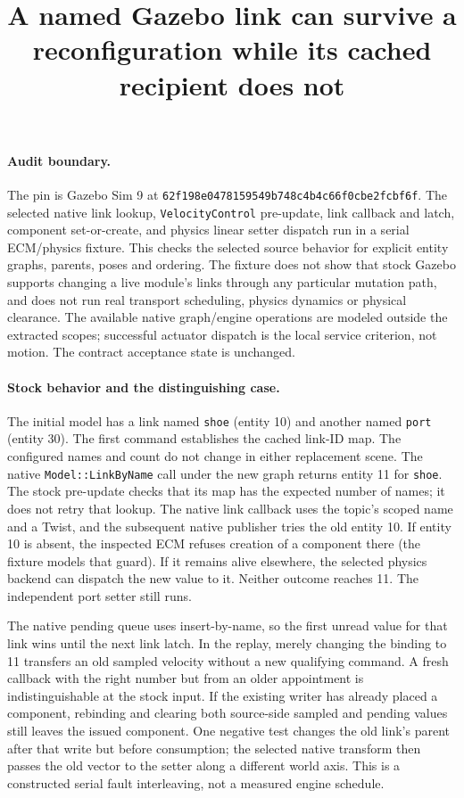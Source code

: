\documentclass{article}
\begin{document}
\title{A named Gazebo link can survive a reconfiguration while its cached recipient does not}
\maketitle

\paragraph{Audit boundary.}
The pin is Gazebo Sim 9 at
\texttt{62f198e0478159549b748c4b4c66f0cbe2fcbf6f}.
The selected native link lookup, \texttt{VelocityControl} pre-update,
link callback and latch, component set-or-create, and physics linear setter
dispatch run in a serial ECM/physics fixture. This checks the selected
source behavior for explicit entity graphs, parents, poses and ordering.
The fixture does not show that stock Gazebo supports changing a live
module's links through any particular mutation path, and does not run
real transport scheduling, physics dynamics or physical clearance.
The available native graph/engine operations are modeled outside the
extracted scopes; successful actuator dispatch is the local service
criterion, not motion. The contract acceptance state is unchanged.

\paragraph{Stock behavior and the distinguishing case.}
The initial model has a link named \texttt{shoe} (entity 10) and another
named \texttt{port} (entity 30). The first command establishes the cached
link-ID map. The configured names and count do not change in either
replacement scene. The native \texttt{Model::LinkByName} call under
the new graph returns entity 11 for \texttt{shoe}. The stock pre-update
checks that its map has the expected number of names; it does not retry
that lookup. The native link callback uses the topic's scoped name and a
Twist, and the subsequent native publisher tries the old entity 10.
If entity 10 is absent, the inspected ECM refuses creation of a component
there (the fixture models that guard). If it remains alive elsewhere, the
selected physics backend can dispatch the new value to it. Neither
outcome reaches 11. The independent port setter still runs.

The native pending queue uses insert-by-name, so the first unread
value for that link wins until the next link latch. In the replay, merely
changing the binding to 11 transfers an old sampled velocity without a
new qualifying command. A fresh callback with the right number but from an
older appointment is indistinguishable at the stock input. If the
existing writer has already placed a component, rebinding and clearing
both source-side sampled and pending values still leaves the issued
component. One negative test changes the old link's parent after that
write but before consumption; the selected native transform then passes
the old vector to the setter along a different world axis. This is a
constructed serial fault interleaving, not a measured engine schedule.
\end{document}
